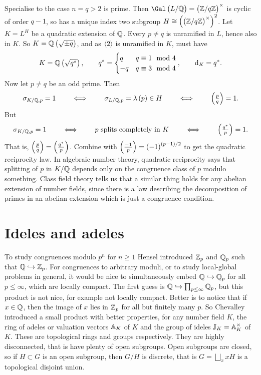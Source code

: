 Specialise to the case $ n = q > 2 $ is prime. Then $ \Gal\br{L / \QQ} = \br{\ZZ / q\ZZ}^\times $ is cyclic of order $ q - 1 $, so has a unique index two subgroup $ H \cong \br{\br{\ZZ / q\ZZ}^\times}^2 $. Let $ K = L^H $ be a quadratic extension of $ \QQ $. Every $ p \ne q $ is unramified in $ L $, hence also in $ K $. So $ K = \QQ\br{\sqrt{\pm q}} $, and as $ \abr{2} $ is unramified in $ K $, must have
$$ K = \QQ\br{\sqrt{q^*}}, \qquad q^* =
\begin{cases}
q & q \equiv 1 \mod 4 \\
-q & q \equiv 3 \mod 4
\end{cases},
\qquad \d_K = q^*. $$
Now let $ p \ne q $ be an odd prime. Then
$$ \sigma_{K / \QQ, p} = 1 \qquad \iff \qquad \sigma_{L / \QQ, p} = \lambda\br{p} \in H \qquad \iff \qquad \br{\tfrac{p}{q}} = 1. $$
But
$$ \sigma_{K / \QQ, p} = 1 \qquad \iff \qquad p \ \text{splits completely in} \ K \qquad \iff \qquad \br{\tfrac{q^*}{p}} = 1. $$
That is, $ \br{\tfrac{p}{q}} = \br{\tfrac{q^*}{p}} $. Combine with $ \br{\tfrac{-1}{p}} = \br{-1}^{\br{p - 1} / 2} $ to get the quadratic reciprocity law. In algebraic number theory, quadratic reciprocity says that splitting of $ p $ in $ K / \QQ $ depends only on the congruence class of $ p $ modulo something. Class field theory tells us that a similar thing holds for any abelian extension of number fields, since there is a law describing the decomposition of primes in an abelian extension which is just a congruence condition.

\pagebreak

\section{Ideles and adeles}

To study congruences modulo $ p^n $ for $ n \ge 1 $ Hensel introduced $ \ZZ_p $ and $ \QQ_p $ such that $ \QQ \hookrightarrow \ZZ_p $. For congruences to arbitrary moduli, or to study local-global problems in general, it would be nice to simultaneously embed $ \QQ \hookrightarrow \QQ_p $ for all $ p \le \infty $, which are locally compact. The first guess is $ \QQ \hookrightarrow \prod_{p \le \infty} \QQ_p $, but this product is not nice, for example not locally compact. Better is to notice that if $ x \in \QQ $, then the image of $ x $ lies in $ \ZZ_p $ for all but finitely many $ p $. So Chevalley introduced a small product with better properties, for any number field $ K $, the ring of adeles or valuation vectors $ \AA_K $ of $ K $ and the group of ideles $ \JJ_K = \AA_K^\times $ of $ K $. These are topological rings and groups respectively. They are highly disconnected, that is have plenty of open subgroups. Open subgroups are closed, so if $ H \subset G $ is an open subgroup, then $ G / H $ is discrete, that is $ G = \bigsqcup_x xH $ is a topological disjoint union.

